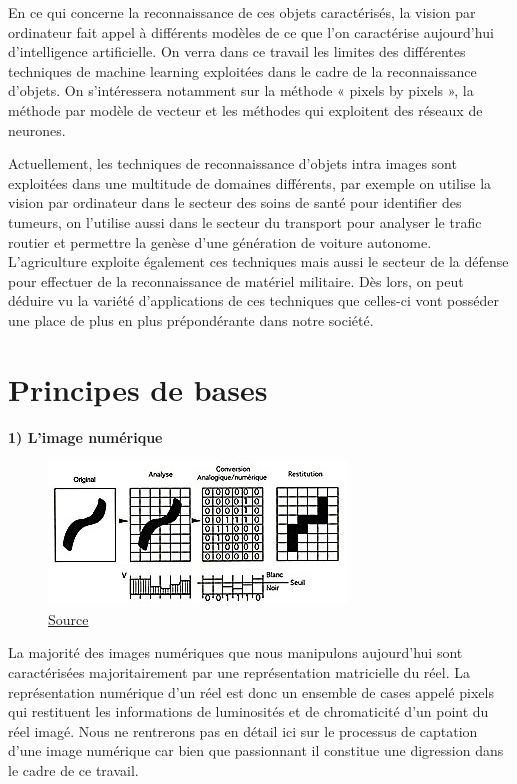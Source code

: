\documentclass[a4paper,12pt]{article} %
\begin{document}
	En ce qui concerne la reconnaissance de ces objets caractérisés, la vision par ordinateur fait appel à différents modèles de ce que l’on caractérise aujourd’hui d’intelligence artificielle. On verra dans ce travail les limites des différentes techniques de machine learning exploitées dans le cadre de la reconnaissance d’objets. On s’intéressera notamment sur la méthode « pixels by pixels », la méthode par modèle de vecteur et les méthodes qui exploitent des réseaux de neurones.\newline

	Actuellement, les techniques de reconnaissance d’objets intra images sont exploitées dans une multitude de domaines différents, par exemple on utilise la vision par ordinateur dans le secteur des soins de santé pour identifier des tumeurs, on l’utilise aussi dans le secteur du transport pour analyser le trafic routier et permettre la genèse d’une génération de voiture autonome. L’agriculture exploite également ces techniques mais aussi le secteur de la défense pour effectuer de la reconnaissance de matériel militaire. Dès lors, on peut déduire vu la variété d’applications de ces techniques que celles-ci vont posséder une place de plus en plus prépondérante dans notre société.\newline
\newpage
\section{Principes de bases}
\textbf{1) L'image numérique }\newline
\begin{figure}[h] %
  \centering %
  \includegraphics[scale=0.8]{binaire.jpg} %
  \caption{\href{http://www.map.toulouse.archi.fr/works/panoformation
  /imagenum/imagenum.html}{Source} } %
\end{figure}
\newline
\par
	La majorité des images numériques que nous manipulons aujourd’hui sont caractérisées majoritairement par une représentation matricielle du réel. La représentation numérique d’un réel est donc un ensemble de cases appelé pixels qui restituent les informations de luminosités et de chromaticité d’un point du réel imagé. Nous ne rentrerons pas en détail ici sur le processus de captation d’une image numérique car bien que passionnant il constitue une digression dans le cadre de ce travail. \newline
\end{document}
